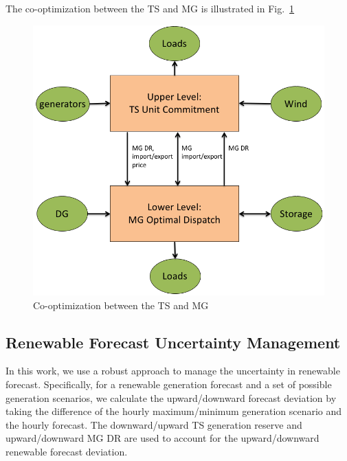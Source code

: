 The co-optimization between the TS and MG is illustrated in Fig.~\ref{wees}
\begin{figure}[H]
\centering
\includegraphics[scale=0.35]{flowc.png}
\caption{Co-optimization between the TS and MG}
\label{wees}
\end{figure}

\subsection{Renewable Forecast Uncertainty Management}
In this work, we use a robust approach to manage the uncertainty in renewable forecast. Specifically, for a renewable generation forecast and a set of possible generation scenarios, we calculate the upward/downward forecast deviation by taking the difference of the hourly maximum/minimum generation scenario and the hourly forecast. The downward/upward TS generation reserve and upward/downward MG DR are used to account for the upward/downward renewable forecast deviation.

